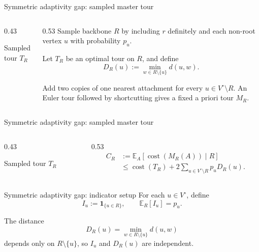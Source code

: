 \documentclass[aspectratio=169,12pt]{beamer}
\newcommand{\E}{\mathbb{E}}
\newcommand{\cost}{\operatorname{cost}}
\begin{document}
\begin{frame}{Symmetric adaptivity gap: sampled master tour}
  \begin{columns}[c,onlytextwidth]
    \begin{column}{0.43\textwidth}
      \centering
      {\small\color{ThBlue}Sampled tour \(T_R\)\par}
      \smallskip
      \resizebox{0.96\linewidth}{!}{\ThSampledBackbone}
    \end{column}
    \begin{column}{0.53\textwidth}
      \small
      Sample backbone \(R\) by including \(r\) definitely and each non-root vertex \(u\) with
      probability \(p_u\).

      \medskip
      Let \(T_R\) be an optimal tour on \(R\), and define
      \[
        D_R(u):=\min_{w\in R\setminus\{u\}}d(u,w).
      \]

      Add two copies of one nearest attachment for every
      \(u\in V^\circ\setminus R\). An Euler tour followed by shortcutting
      gives a fixed a priori tour \(M_R\).
    \end{column}
  \end{columns}
\end{frame}

\begin{frame}{Symmetric adaptivity gap: sampled master tour}
  \begin{columns}[c,onlytextwidth]
    \begin{column}{0.43\textwidth}
      \centering
      {\small\color{ThBlue}Sampled tour \(T_R\)\par}
      \smallskip
      \resizebox{0.96\linewidth}{!}{\ThSampledBackbone}
    \end{column}
    \begin{column}{0.53\textwidth}
        \begin{align*}
            C_R &:=\E_A[\cost(M_R(A))\mid R] \\
                &\le \cost(T_R)
          +2\!\sum_{u\in V^\circ\setminus R}p_uD_R(u).
      \end{align*}


    \end{column}
  \end{columns}
\end{frame}

\begin{frame}{Symmetric adaptivity gap: indicator setup}
  For each \(u\in V^\circ\), define
  \[
    I_u:=\mathbf 1_{\{u\in R\}},
    \qquad
    \E_R[I_u]=p_u.
  \]

  \medskip
  The distance
  \[
    D_R(u)=\min_{w\in R\setminus\{u\}}d(u,w)
  \]
  depends only on \(R\setminus\{u\}\), so \(I_u\) and \(D_R(u)\) are
  independent.
\end{frame}
\end{document}
